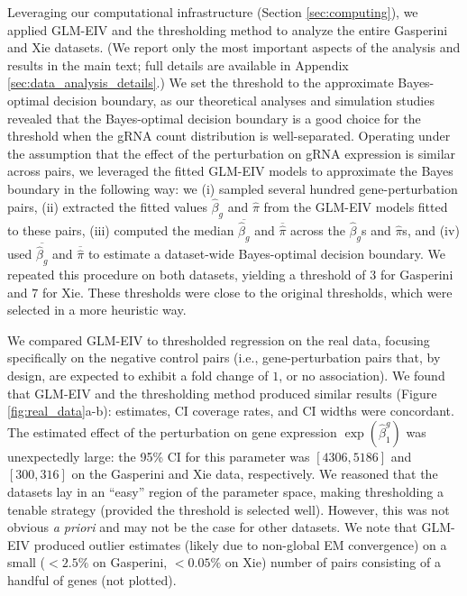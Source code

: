 \documentclass[12pt]{article}
\begin{document}
Leveraging our computational infrastructure (Section \ref{sec:computing}), we applied GLM-EIV and the thresholding method to analyze the entire Gasperini and Xie datasets. (We report only the most important aspects of the analysis and results in the main text; full details are available in Appendix \ref{sec:data_analysis_details}.) We set the threshold to the approximate Bayes-optimal decision boundary, as our theoretical analyses and simulation studies revealed that the Bayes-optimal decision boundary is a good choice for the threshold when the gRNA count distribution is well-separated. Operating under the assumption that the effect of the perturbation on gRNA expression is similar across pairs, we leveraged the fitted GLM-EIV models to approximate the Bayes boundary in the following way: we (i) sampled several hundred gene-perturbation pairs, (ii) extracted the fitted values $\hat{\beta}_g$ and $\hat{\pi}$ from the GLM-EIV models fitted to these pairs, (iii) computed the median $\overline{\hat{\beta}_g}$ and $\overline{\hat{\pi}}$ across the $\hat{\beta}_g$s and $\hat{\pi}$s, and (iv) used $\overline{\hat{\beta}_g}$ and $\overline{\hat{\pi}}$ to estimate a dataset-wide Bayes-optimal decision boundary. We repeated this procedure on both datasets, yielding a threshold of $3$ for Gasperini and $7$ for Xie. These thresholds were close to the original thresholds, which were selected in a more heuristic way.

We compared GLM-EIV to thresholded regression on the real data, focusing specifically on the negative control pairs (i.e., gene-perturbation pairs that, by design, are expected to exhibit a fold change of $1$, or no association). We found that GLM-EIV and the thresholding method produced similar results (Figure \ref{fig:real_data}a-b): estimates, CI coverage rates, and CI widths were concordant. The estimated effect of the perturbation on gene expression $\exp(\hat{\beta}_1^g)$ was unexpectedly large: the 95\% CI for this parameter was $[4306, 5186]$ and $[300, 316]$ on the Gasperini and Xie data, respectively. We reasoned that the datasets lay in an ``easy'' region of the parameter space, making thresholding a tenable strategy (provided the threshold is selected well). However, this was not obvious \textit{a priori} and may not be the case for other datasets. We note that GLM-EIV produced outlier estimates (likely due to non-global EM convergence) on a small ($< 2.5 \%$ on Gasperini, $<0.05\%$ on Xie) number of pairs consisting of a handful of genes (not plotted).
\end{document}
